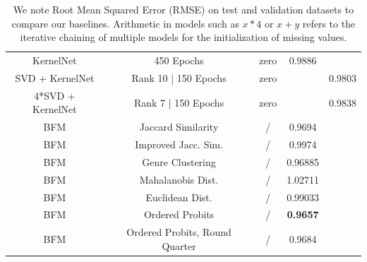 \documentclass[10pt,conference,compsocconf]{IEEEtran}
\begin{document}
\begin{table}
{\begin{tabular}{|| c | c | c | c | c ||}
                KernelNet         & 450 Epochs                        & zero                    & 0.9886                 &                         \\
                SVD + KernelNet   & Rank 10 | 150 Epochs              & zero                    &                        & 0.9803                  \\
                4*SVD + KernelNet & Rank 7 | 150 Epochs               & zero                    &                        & 0.9838                  \\
                \hline
                BFM               & Jaccard Similarity                & /                       & 0.9694                 &                         \\
                BFM               & Improved Jacc. Sim.               & /                       & 0.9974                 &                         \\
                BFM               & Genre Clustering                  & /                       & 0.96885                &                         \\
                BFM               & Mahalanobis Dist.                 & /                       & 1.02711                &                         \\
                BFM               & Euclidean Dist.                   & /                       & 0.99033                &                         \\
                BFM               & Ordered Probits                   & /                       & \textbf{ 0.9657 }      &                         \\
                BFM               & Ordered Probits, Round Quarter    & /                       & 0.9684                 &                         \\
                \hline
            \end{tabular}
        }
        \caption{We note Root Mean Squared Error (RMSE) on test and validation datasets to compare our baselines.
        Arithmetic in models such as $x * 4$ or $x + y$ refers to the iterative chaining of multiple models for the initialization of missing values.
        }
        \label{tab:ablation}
    \end{table}
\end{document}
